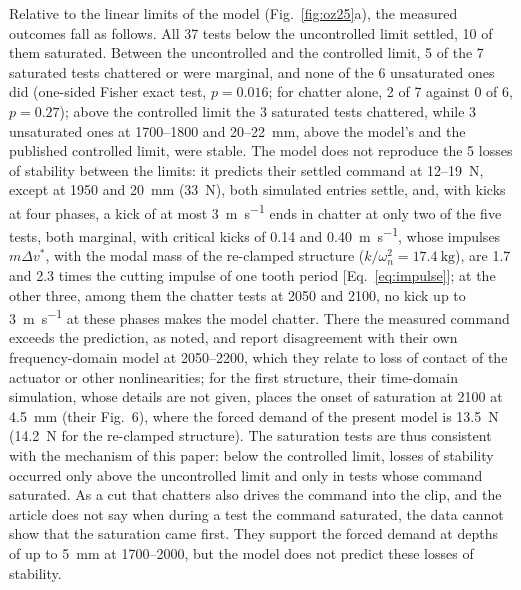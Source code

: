 Relative to the linear limits of the model (Fig.~\ref{fig:oz25}a), the measured outcomes fall as follows. All 37 tests below the uncontrolled limit settled, 10 of them saturated. Between the uncontrolled and the controlled limit, 5 of the 7 saturated tests chattered or were marginal, and none of the 6 unsaturated ones did (one-sided Fisher exact test, $p=0.016$; for chatter alone, 2 of 7 against 0 of 6, $p=0.27$); above the controlled limit the 3 saturated tests chattered, while 3 unsaturated ones at 1700--\SI{1800}{\rpm} and 20--\SI{22}{\milli\metre}, above the model's and the published controlled limit, were stable. The model does not reproduce the 5 losses of stability between the limits: it predicts their settled command at 12--\SI{19}{\newton}, except at \SI{1950}{\rpm} and \SI{20}{\milli\metre} (\SI{33}{\newton}), both simulated entries settle, and, with kicks at four phases, a kick of at most \SI{3}{\metre\per\second} ends in chatter at only two of the five tests, both marginal, with critical kicks of 0.14 and \SI{0.40}{\metre\per\second}, whose impulses $m\Delta v^*$, with the modal mass of the re-clamped structure ($k/\omega_n^2=\SI{17.4}{\kilogram}$), are 1.7 and 2.3 times the cutting impulse of one tooth period [Eq.~\eqref{eq:impulse}]; at the other three, among them the chatter tests at 2050 and \SI{2100}{\rpm}, no kick up to \SI{3}{\metre\per\second} at these phases makes the model chatter. There the measured command exceeds the prediction, as noted, and \citet{ozsoy2025frequency} report disagreement with their own frequency-domain model at 2050--\SI{2200}{\rpm}, which they relate to loss of contact of the actuator or other nonlinearities; for the first structure, their time-domain simulation, whose details are not given, places the onset of saturation at \SI{2100}{\rpm} at \SI{4.5}{\milli\metre} (their Fig.~6), where the forced demand of the present model is \SI{13.5}{\newton} (\SI{14.2}{\newton} for the re-clamped structure). The saturation tests are thus consistent with the mechanism of this paper: below the controlled limit, losses of stability occurred only above the uncontrolled limit and only in tests whose command saturated. As a cut that chatters also drives the command into the clip, and the article does not say when during a test the command saturated, the data cannot show that the saturation came first. They support the forced demand at depths of up to \SI{5}{\milli\metre} at 1700--\SI{2000}{\rpm}, but the model does not predict these losses of stability.
